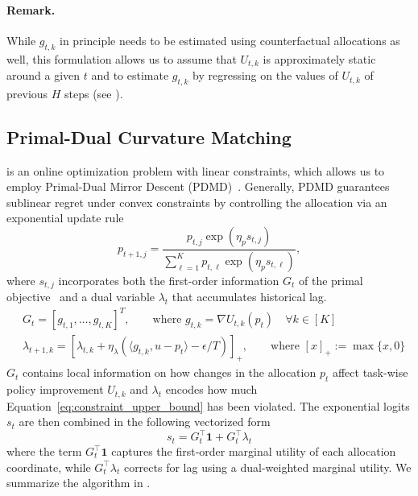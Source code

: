 \paragraph{Remark.} While $g_{t, k}$ in principle needs to be estimated using counterfactual allocations as well, this formulation allows us to assume that $U_{t, k}$ is approximately static around a given $t$ and to estimate $g_{t,k}$ by regressing on the values of $U_{t, k}$ of previous $H$ steps (see ).



\vspace{-0.05in}
\subsection{Primal-Dual Curvature Matching}
\vspace{-0.05in}
 is an online optimization problem with linear constraints, which allows us to employ Primal-Dual Mirror Descent (PDMD)~\citep{Beck2003MirrorDA,mahdavi2011trading,jenatton2015adaptivealgorithmsonlineconvex}. Generally, PDMD guarantees sublinear regret under convex constraints by controlling the allocation via an exponential update rule
\begin{equation} \label{eq:primal_update}
p_{t+1,j}
= 
\frac{p_{t,j}\exp(\eta_p s_{t,j})}
{\sum_{\ell=1}^Kp_{t,\ell}\exp(\eta_p s_{t,\ell})},
\end{equation}
where $s_{t, j}$ incorporates both the first-order information $G_t$ of the primal objective~ and a dual variable $\lambda_t$ that accumulates historical lag.
\begin{align}
& G_t = \left[ g_{t, 1}, \dots, g_{t, K} \right]^T, 
\qquad 
\text{where }
g_{t, k} = \nabla U_{t, k}(p_t) \quad \forall k \in [K]
\label{eq:dual_weighted_marginal_utility_vectorized} \\
& \lambda_{t+1, k} = \left[ \lambda_{t, k} + \eta_\lambda \left( \langle g_{t, k}, u - p_t \rangle - \epsilon / T \right) \right]_+,\qquad 
\text{where }  [x]_+ := \max\{x, 0\}
\label{eq:dual_update}
\end{align}
$G_t$ contains local information on how changes in the allocation $p_t$ affect task-wise policy improvement $U_{t, k}$ and $\lambda_{t}$ encodes how much Equation~\ref{eq:constraint_upper_bound} has been violated. The exponential logits $s_{t}$ are then combined in the following vectorized form
\begin{equation} \label{eq:s_combined}
s_t
=
G_t^\top \mathbf{1} + G_t^\top \lambda_t
\end{equation}
where the term $G_t^\top \mathbf{1}$ captures the first-order marginal utility of each allocation coordinate, while
$G_t^\top \lambda_t$ corrects for lag using a dual-weighted marginal utility.
We summarize the algorithm in . 

